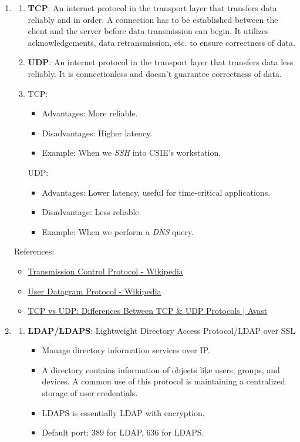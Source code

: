 \documentclass[12pt, a4paper]{article}
\begin{document}
\begin{enumerate}
    \item
    \begin{enumerate}
      \item \textbf{TCP}: An internet protocol in the transport layer that
        transfers data reliably and in order. A connection has to be established
        between the client and the server before data transmission can begin. It
        utilizes acknowledgements, data retransmission, etc. to ensure
        correctness of data.
      \item \textbf{UDP}: An internet protocol in the transport layer that
        transfers data less reliably. It is connectionless and doesn't guarantee
        correctness of data.
      \item TCP:
        \begin{itemize}
          \item Advantages: More reliable.
          \item Disadvantages: Higher latency.
          \item Example: When we \textit{SSH} into CSIE's workstation.
        \end{itemize}
        UDP:
        \begin{itemize}
          \item Advantages: Lower latency, useful for time-critical applications.
          \item Disadvantage: Less reliable.
          \item Example: When we perform a \textit{DNS} query.
        \end{itemize}
    \end{enumerate}
    References:
    \begin{itemize}
      \item \href{https://en.wikipedia.org/wiki/Transmission_Control_Protocol}{Transmission Control Protocol - Wikipedia}
      \item \href{https://en.wikipedia.org/wiki/User_Datagram_Protocol}{User Datagram Protocol - Wikipedia}
      \item \href{https://www.avast.com/c-tcp-vs-udp-difference}{TCP vs UDP: Differences Between TCP \& UDP Protocols | Avast}
    \end{itemize}

    \item
    \begin{enumerate}
      \item \textbf{LDAP/LDAPS}: Lightweight Directory Access Protocol/LDAP over SSL
      \begin{itemize}
        \item Manage directory information services over IP.
        \item A directory contains information of objects like users, groups,
          and devices. A common use of this protocol is maintaining a
          centralized storage of user credentials.
        \item LDAPS is essentially LDAP with encryption.
        \item Default port: 389 for LDAP, 636 for LDAPS.
      \end{itemize}


\end{enumerate}
\end{enumerate}
\end{document}

